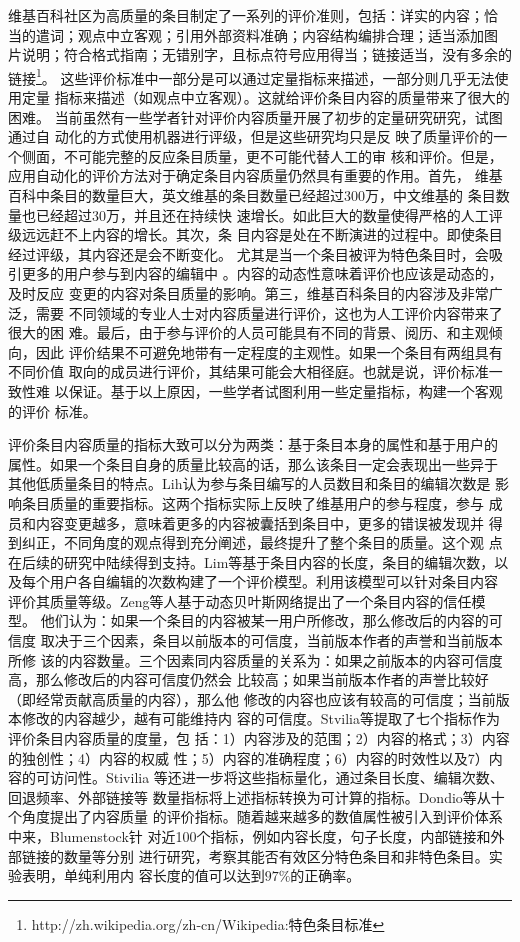 维基百科社区为高质量的条目制定了一系列的评价准则，包括：详实的内容；恰
当的遣词；观点中立客观；引用外部资料准确；内容结构编排合理；适当添加图
片说明；符合格式指南；无错别字，且标点符号应用得当；链接适当，没有多余的链接\footnote{http://zh.wikipedia.org/zh-cn/Wikipedia:特色条目标准}。
这些评价标准中一部分是可以通过定量指标来描述，一部分则几乎无法使用定量
指标来描述（如观点中立客观）。这就给评价条目内容的质量带来了很大的困难。
当前虽然有一些学者针对评价内容质量开展了初步的定量研究研究，试图通过自
动化的方式使用机器进行评级，但是这些研究均只是反
映了质量评价的一个侧面，不可能完整的反应条目质量，更不可能代替人工的审
核和评价。但是，应用自动化的评价方法对于确定条目内容质量仍然具有重要的作用。首先，
维基百科中条目的数量巨大，英文维基的条目数量已经超过300万，中文维基的
条目数量也已经超过30万，并且还在持续快
速增长。如此巨大的数量使得严格的人工评级远远赶不上内容的增长。其次，条
目内容是处在不断演进的过程中。即使条目经过评级，其内容还是会不断变化。
尤其是当一个条目被评为特色条目时，会吸引更多的用户参与到内容的编辑中
\cite{thomas.woehner}。内容的动态性意味着评价也应该是动态的，及时反应
变更的内容对条目质量的影响。第三，维基百科条目的内容涉及非常广泛，需要
不同领域的专业人士对内容质量进行评价，这也为人工评价内容带来了很大的困
难。最后，由于参与评价的人员可能具有不同的背景、阅历、和主观倾向，因此
评价结果不可避免地带有一定程度的主观性。如果一个条目有两组具有不同价值
取向的成员进行评价，其结果可能会大相径庭。也就是说，评价标准一致性难
以保证。基于以上原因，一些学者试图利用一些定量指标，构建一个客观的评价
标准。

评价条目内容质量的指标大致可以分为两类：基于条目本身的属性和基于用户的
属性。如果一个条目自身的质量比较高的话，那么该条目一定会表现出一些异于
其他低质量条目的特点。Lih认为参与条目编写的人员数目和条目的编辑次数是
影响条目质量的重要指标。这两个指标实际上反映了维基用户的参与程度，参与
成员和内容变更越多，意味着更多的内容被囊括到条目中，更多的错误被发现并
得到纠正，不同角度的观点得到充分阐述，最终提升了整个条目的质量。这个观
点在后续的研究中陆续得到支持。Lim等基于条目内容的长度，条目的编辑次数，以
及每个用户各自编辑的次数构建了一个评价模型。利用该模型可以针对条目内容
评价其质量等级。Zeng等人基于动态贝叶斯网络提出了一个条目内容的信任模型。
他们认为：如果一个条目的内容被某一用户所修改，那么修改后的内容的可信度
取决于三个因素，条目以前版本的可信度，当前版本作者的声誉和当前版本所修
该的内容数量。三个因素同内容质量的关系为：如果之前版本的内容可信度高，那么修改后的内容可信度仍然会
比较高；如果当前版本作者的声誉比较好（即经常贡献高质量的内容），那么他
修改的内容也应该有较高的可信度；当前版本修改的内容越少，越有可能维持内
容的可信度。Stvilia等提取了七个指标作为评价条目内容质量的度量，包
括：1）内容涉及的范围；2）内容的格式；3）内容的独创性；4）内容的权威
性；5）内容的准确程度；6）内容的时效性以及7）内容的可访问性。Stivilia
等还进一步将这些指标量化，通过条目长度、编辑次数、回退频率、外部链接等
数量指标将上述指标转换为可计算的指标。Dondio等从十个角度提出了内容质量
的评价指标。随着越来越多的数值属性被引入到评价体系中来，Blumenstock针
对近100个指标，例如内容长度，句子长度，内部链接和外部链接的数量等分别
进行研究，考察其能否有效区分特色条目和非特色条目。实验表明，单纯利用内
容长度的值可以达到$97\%$的正确率。

